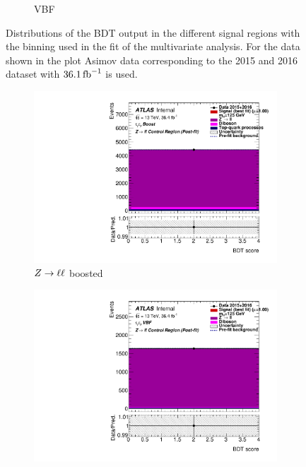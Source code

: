 \begin{figure}[htb]
\begin{subfigure}[t]{0.45\textwidth}
        \caption{VBF}
    \end{subfigure}
    \caption{Distributions of the BDT output in the different signal regions with the binning used in the fit of the multivariate analysis.
             For the data shown in the plot Asimov data corresponding to the 2015 and 2016 dataset with $\SI{36.1}{\invfb}$ is used.}\label{fig:fit:input:mva:SR}
\end{figure}

\begin{figure}[htb]
    \centering
    \begin{subfigure}[t]{0.45\textwidth}
        \includegraphics[width=\textwidth]{./plots/fit/mva/zll_boost.pdf}
        \caption{$Z \to \ell \ell$ boosted}
    \end{subfigure}
    \begin{subfigure}[t]{0.45\textwidth}
        \includegraphics[width=\textwidth]{./plots/fit/mva/zll_vbf.pdf}

\end{subfigure}
\end{figure}
